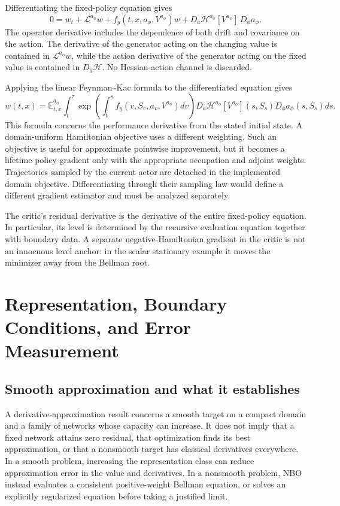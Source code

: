 \documentclass[ecta,draft]{econsocart}
\newcommand{\E}{\mathbb E}
\newcommand{\HH}{\mathcal H}
\newcommand{\LL}{\mathcal L}
\begin{document}
Differentiating the fixed-policy equation gives
\[
 0=w_t+\LL^{a_\phi}w+f_y(t,x,a_\phi,V^{a_\phi})w
  +D_a\HH^{a_\phi}[V^{a_\phi}]\,D_\phi a_\phi.
\]
The operator derivative includes the dependence of both drift and covariance on the action. The derivative of the generator acting on the changing value is contained in $\LL^{a_\phi}w$, while the action derivative of the generator acting on the fixed value is contained in $D_a\HH$. No Hessian-action channel is discarded.

Applying the linear Feynman--Kac formula to the differentiated equation gives
\[
 w(t,x)=\E_{t,x}^{a_\phi}\int_t^\tau
 \exp\left(\int_t^s f_y(v,S_v,a_v,V^{a_\phi})dv\right)
 D_a\HH^{a_\phi}[V^{a_\phi}](s,S_s)D_\phi a_\phi(s,S_s)ds.
\]
This formula concerns the performance derivative from the stated initial state. A domain-uniform Hamiltonian objective uses a different weighting. Such an objective is useful for approximate pointwise improvement, but it becomes a lifetime policy gradient only with the appropriate occupation and adjoint weights. Trajectories sampled by the current actor are detached in the implemented domain objective. Differentiating through their sampling law would define a different gradient estimator and must be analyzed separately.

The critic's residual derivative is the derivative of the entire fixed-policy equation. In particular, its level is determined by the recursive evaluation equation together with boundary data. A separate negative-Hamiltonian gradient in the critic is not an innocuous level anchor: in the scalar stationary example it moves the minimizer away from the Bellman root.

\section{Representation, Boundary Conditions, and Error Measurement}
\subsection{Smooth approximation and what it establishes}
A derivative-approximation result concerns a smooth target on a compact domain and a family of networks whose capacity can increase. It does not imply that a fixed network attains zero residual, that optimization finds its best approximation, or that a nonsmooth target has classical derivatives everywhere. In a smooth problem, increasing the representation class can reduce approximation error in the value and derivatives. In a nonsmooth problem, NBO instead evaluates a consistent positive-weight Bellman equation, or solves an explicitly regularized equation before taking a justified limit.
\end{document}
